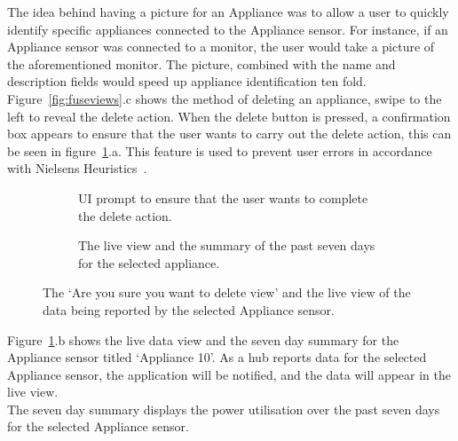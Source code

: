 \documentclass[draft,preprint,12pt,3p]{elsarticle}
\begin{document}
The idea behind having a picture for an Appliance was to allow a user to quickly identify specific appliances connected to the Appliance sensor. For instance, if an Appliance sensor was connected to a monitor, the user would take a picture of the aforementioned monitor. The picture, combined with the name and description fields would speed up appliance identification ten fold.\\
Figure~\ref{fig:fuseviews}.c shows the method of deleting an appliance, swipe to the left to reveal the delete action. When the delete button is pressed, a confirmation box appears to ensure that the user wants to carry out the delete action, this can be seen in figure~\ref{fig:deletelive}.a. This feature is used to prevent user errors in accordance with Nielsens Heuristics~\cite{nielsen}.

\begin{figure}[H]
    \centering
    \begin{subfigure}[t]{0.32\columnwidth}
        \centering
        \caption{UI prompt to ensure that the user wants to complete the delete action.}
    \end{subfigure}
    \begin{subfigure}[t]{0.32\columnwidth}
        \centering
        \caption{The live view and the summary of the past seven days for the selected appliance.}
    \end{subfigure}
    \caption{The `Are you sure you want to delete view' and the live view of the data being reported by the selected Appliance sensor.}
    \label{fig:deletelive}
\end{figure}
Figure~\ref{fig:deletelive}.b shows the live data view and the seven day summary for the Appliance sensor titled `Appliance 10'. As a hub reports data for the selected Appliance sensor, the application will be notified, and the data will appear in the live view.\\
The seven day summary displays the power utilisation over the past seven days for the selected Appliance sensor.
\end{document}
